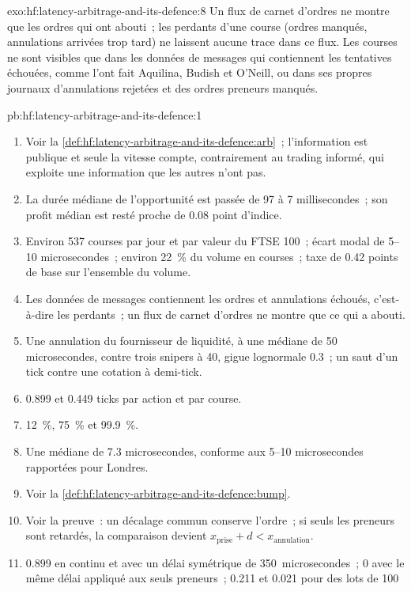 \begin{solution}{exo:hf:latency-arbitrage-and-its-defence:8}
Un flux de carnet d'ordres ne montre que les ordres qui ont abouti~; les perdants d'une course (ordres manqués, annulations arrivées trop tard) ne laissent aucune trace dans ce flux.
Les courses ne sont visibles que dans les données de messages qui contiennent les tentatives échouées, comme l'ont fait Aquilina, Budish et O'Neill, ou dans ses propres journaux d'annulations rejetées et
des ordres preneurs manqués.
\end{solution}

\begin{solution}{pb:hf:latency-arbitrage-and-its-defence:1}
\begin{enumerate}
\item Voir la \cref{def:hf:latency-arbitrage-and-its-defence:arb}~; l'information est publique et seule la vitesse compte, contrairement au trading informé, qui exploite
une information que les autres n'ont pas.
\item La durée médiane de l'opportunité est passée de 97 à 7 millisecondes~; son profit médian est resté proche de 0.08 point d'indice.
\item Environ 537 courses par jour et par valeur du FTSE 100~; écart modal de 5--10 microsecondes~; environ 22~\% du volume en courses~; taxe de 0.42 points de base sur l'ensemble du volume.
\item Les données de messages contiennent les ordres et annulations échoués, c'est-à-dire les perdants~; un flux de carnet d'ordres ne montre que ce qui a abouti.
\item Une annulation du fournisseur de liquidité, à une médiane de 50 microsecondes, contre trois snipers à 40, gigue lognormale 0.3~; un saut d'un tick contre une cotation à demi-tick.
\item 0.899 et 0.449 ticks par action et par course.
\item 12~\%, 75~\% et 99.9~\%.
\item Une médiane de 7.3 microsecondes, conforme aux 5--10 microsecondes rapportées pour Londres.
\item Voir la \cref{def:hf:latency-arbitrage-and-its-defence:bump}.
\item Voir la preuve~: un décalage commun conserve l'ordre~; si seuls les preneurs sont retardés, la comparaison devient $x_{\text{prise}}+d<x_{\text{annulation}}$.
\item 0.899 en continu et avec un délai symétrique de 350~microsecondes~; 0 avec le même délai appliqué aux seuls preneurs~; 0.211 et 0.021 pour des lots de 100

\end{enumerate}
\end{solution}
